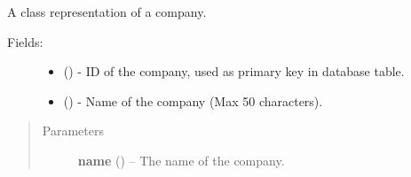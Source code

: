 \documentclass[letterpaper,10pt,english]{sphinxmanual}
\begin{document}

\begin{fulllineitems}
\label{models:models.Company}
A class representation of a company.
\begin{description}
\item[{Fields:}] \leavevmode\begin{itemize}
\item {} 
        ()        - ID of the company, used as primary key in database table.

\item {} 
        ()        - Name of the company (Max 50 characters).

\end{itemize}

\end{description}
\begin{quote}\begin{description}
\item[{Parameters}] \leavevmode
\textbf{name} () -- The name of the company.

\end{description}\end{quote}

\end{fulllineitems}

\end{document}
